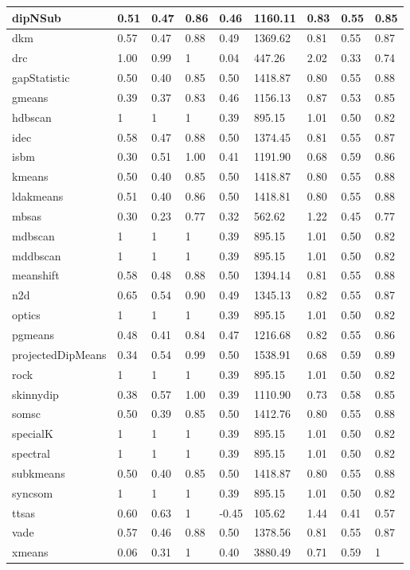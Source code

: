 \begin{table}[H]
\begin{tabular}{|l|l|l|l|l|l|l|l|l|}
\hline
dipNSub & 0.51 & 0.47 & 0.86 & 0.46 & 1160.11 & 0.83 & 0.55 & 0.85 \\
\hline
dkm & 0.57 & 0.47 & 0.88 & 0.49 & 1369.62 & 0.81 & 0.55 & 0.87 \\
\hline
drc & 1.00 & 0.99 & 1 & 0.04 & 447.26 & 2.02 & 0.33 & 0.74 \\
\hline
gapStatistic & 0.50 & 0.40 & 0.85 & 0.50 & 1418.87 & 0.80 & 0.55 & 0.88 \\
\hline
gmeans & 0.39 & 0.37 & 0.83 & 0.46 & 1156.13 & 0.87 & 0.53 & 0.85 \\
\hline
hdbscan & 1 & 1 & 1 & 0.39 & 895.15 & 1.01 & 0.50 & 0.82 \\
\hline
idec & 0.58 & 0.47 & 0.88 & 0.50 & 1374.45 & 0.81 & 0.55 & 0.87 \\
\hline
isbm & 0.30 & 0.51 & 1.00 & 0.41 & 1191.90 & 0.68 & 0.59 & 0.86 \\
\hline
kmeans & 0.50 & 0.40 & 0.85 & 0.50 & 1418.87 & 0.80 & 0.55 & 0.88 \\
\hline
ldakmeans & 0.51 & 0.40 & 0.86 & 0.50 & 1418.81 & 0.80 & 0.55 & 0.88 \\
\hline
mbsas & 0.30 & 0.23 & 0.77 & 0.32 & 562.62 & 1.22 & 0.45 & 0.77 \\
\hline
mdbscan & 1 & 1 & 1 & 0.39 & 895.15 & 1.01 & 0.50 & 0.82 \\
\hline
mddbscan & 1 & 1 & 1 & 0.39 & 895.15 & 1.01 & 0.50 & 0.82 \\
\hline
meanshift & 0.58 & 0.48 & 0.88 & 0.50 & 1394.14 & 0.81 & 0.55 & 0.88 \\
\hline
n2d & 0.65 & 0.54 & 0.90 & 0.49 & 1345.13 & 0.82 & 0.55 & 0.87 \\
\hline
optics & 1 & 1 & 1 & 0.39 & 895.15 & 1.01 & 0.50 & 0.82 \\
\hline
pgmeans & 0.48 & 0.41 & 0.84 & 0.47 & 1216.68 & 0.82 & 0.55 & 0.86 \\
\hline
projectedDipMeans & 0.34 & 0.54 & 0.99 & 0.50 & 1538.91 & 0.68 & 0.59 & 0.89 \\
\hline
rock & 1 & 1 & 1 & 0.39 & 895.15 & 1.01 & 0.50 & 0.82 \\
\hline
skinnydip & 0.38 & 0.57 & 1.00 & 0.39 & 1110.90 & 0.73 & 0.58 & 0.85 \\
\hline
somsc & 0.50 & 0.39 & 0.85 & 0.50 & 1412.76 & 0.80 & 0.55 & 0.88 \\
\hline
specialK & 1 & 1 & 1 & 0.39 & 895.15 & 1.01 & 0.50 & 0.82 \\
\hline
spectral & 1 & 1 & 1 & 0.39 & 895.15 & 1.01 & 0.50 & 0.82 \\
\hline
subkmeans & 0.50 & 0.40 & 0.85 & 0.50 & 1418.87 & 0.80 & 0.55 & 0.88 \\
\hline
syncsom & 1 & 1 & 1 & 0.39 & 895.15 & 1.01 & 0.50 & 0.82 \\
\hline
ttsas & 0.60 & 0.63 & 1 & -0.45 & 105.62 & 1.44 & 0.41 & 0.57 \\
\hline
vade & 0.57 & 0.46 & 0.88 & 0.50 & 1378.56 & 0.81 & 0.55 & 0.87 \\
\hline
xmeans & 0.06 & 0.31 & 1 & 0.40 & 3880.49 & 0.71 & 0.59 & 1 \\
\hline
\end{tabular}
\end{table}
